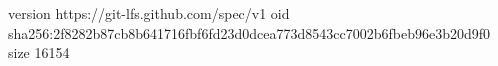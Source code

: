 version https://git-lfs.github.com/spec/v1
oid sha256:2f8282b87cb8b641716fbf6fd23d0dcea773d8543cc7002b6fbeb96e3b20d9f0
size 16154
